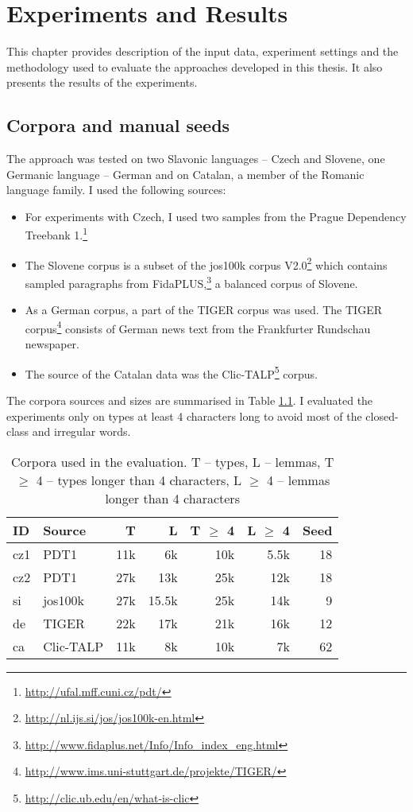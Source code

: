 \chapter{Experiments and Results}\label{chapter:results}
This chapter provides description of the input data, experiment settings and the metho\-do\-logy used to evaluate the approaches developed in this thesis. It also presents the results of the experiments.

\section{Corpora and manual seeds}
The approach was tested on two Slavonic languages -- Czech and Slovene, one Germanic language -- German and on Catalan, a member of the Romanic language family. I used the following sources:
\begin{itemize}
\item For experiments with Czech, I used two samples from the Prague Dependency Treebank 1.\footnote{\url{http://ufal.mff.cuni.cz/pdt/}}
\item The Slovene corpus is a subset of the jos100k corpus V2.0\footnote{\url{http://nl.ijs.si/jos/jos100k-en.html}} which contains sampled paragraphs from FidaPLUS,\footnote{\url{http://www.fidaplus.net/Info/Info_index_eng.html}} a balanced corpus of Slovene.
\item  As a German corpus, a part of the TIGER corpus was used. The TIGER corpus\footnote{\url{http://www.ims.uni-stuttgart.de/projekte/TIGER/}} consists of German news text from the Frankfurter Rundschau newspaper.
\item The source of the Catalan data was the Clic-TALP\footnote{\url{http://clic.ub.edu/en/what-is-clic}} corpus. 
\end{itemize}
The corpora sources and sizes are summarised in Table \ref{table:corpora}. I evaluated the experiments only on types at least 4 characters long to avoid most of the closed-class and irregular words. 

\begin{table}[h]
\begin{center}
\begin{tabular}{llrrrrr}
\toprule
\bf ID &\bf Source & \bf T & \bf L & \bf T $\geq$ 4 & \bf L $\geq$ 4 & \bf Seed\\
\midrule
cz1 & PDT1 & 11k & 6k & 10k & 5.5k & 18\\
cz2 & PDT1 & 27k & 13k & 25k & 12k & 18\\
si & jos100k & 27k & 15.5k & 25k & 14k & 9\\
de & TIGER & 22k & 17k & 21k & 16k & 12\\
ca & Clic-TALP & 11k & 8k & 10k & 7k & 62\\
\bottomrule
\end{tabular}
\end{center}
\caption{\label{table:corpora} Corpora used in the evaluation. T -- types, L -- lemmas,  T $\geq$ 4 -- types longer than 4 characters, L $\geq$ 4 -- lemmas longer than 4 characters}
\end{table}

